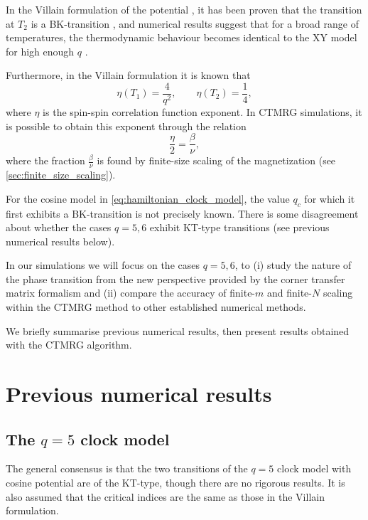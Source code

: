 In the Villain formulation of the potential \cite{villain1975theory}, it has been proven that the transition at $T_2$ is
a BK-transition \cite{jose1977renormalization}, and numerical results suggest that for a broad range of temperatures,
the thermodynamic behaviour becomes identical to the XY model for high enough $q$ \cite{lapilli2006universality}.

Furthermore, in the Villain formulation it is known that \cite{elitzur1979phase, nienhuis1984critical}
\begin{equation}\label{eq:eta_villain}
  \eta(T_1) =\frac{4}{q^2}, \qquad \eta(T_2) = \frac{1}{4},
\end{equation}
where $\eta$ is the spin-spin correlation function exponent.
In CTMRG simulations, it is possible to obtain this exponent through the relation
\begin{equation}
  \frac{\eta}{2} = \frac{\beta}{\nu},
\end{equation}
where the fraction $\frac{\beta}{\nu}$ is found by finite-size scaling of the magnetization (see
\autoref{sec:finite_size_scaling}).

For the cosine model in \autoref{eq:hamiltonian_clock_model}, the value $q_c$ for which it first exhibits a
BK-transition is not precisely known.
There is some disagreement about whether the cases $q = 5, 6$ exhibit KT-type transitions (see previous numerical
results below).

In our simulations we will focus on the cases $q = 5, 6$, to (i) study the nature of the phase transition from the new
perspective provided by the corner transfer matrix formalism and (ii) compare the accuracy of finite-$m$ and finite-$N$
scaling within the CTMRG method to other established numerical methods.

We briefly summarise previous numerical results, then present results obtained with the CTMRG algorithm.

\section{Previous numerical results}
\subsection{The $q = 5$ clock model}

The general consensus is that the two transitions of the $q = 5$ clock model with cosine potential are of the KT-type,
though there are no rigorous results.
It is also assumed that the critical indices are the same as those in the Villain formulation.

